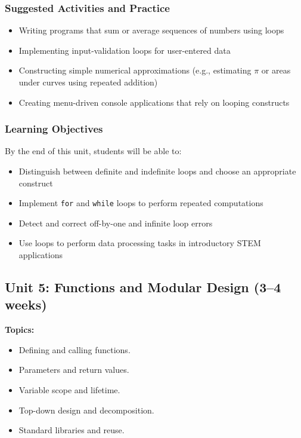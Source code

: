 \documentclass[12pt,oneside]{book}
\begin{document}
\subsubsection{Suggested Activities and Practice}

\begin{itemize}
    \item Writing programs that sum or average sequences of numbers using loops
    \item Implementing input-validation loops for user-entered data
    \item Constructing simple numerical approximations (e.g., estimating \(\pi\) or areas under curves using repeated addition)
    \item Creating menu-driven console applications that rely on looping constructs
\end{itemize}

\subsubsection*{Learning Objectives}

By the end of this unit, students will be able to:

\begin{itemize}[leftmargin=*]
    \item Distinguish between definite and indefinite loops and choose an appropriate construct
    \item Implement \texttt{for} and \texttt{while} loops to perform repeated computations
    \item Detect and correct off-by-one and infinite loop errors
    \item Use loops to perform data processing tasks in introductory STEM applications
\end{itemize}

\subsection{Unit 5: Functions and Modular Design (3--4 weeks)}

\textbf{Topics:}
\begin{itemize}
    \item Defining and calling functions.
    \item Parameters and return values.
    \item Variable scope and lifetime.
    \item Top-down design and decomposition.
    \item Standard libraries and reuse.
\end{itemize}
\end{document}
